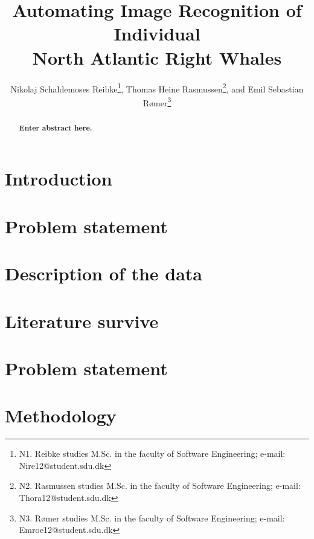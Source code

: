 \documentclass[10pt,a4paper,twocolumn]{article}
\begin{document}
\title{\textbf{Automating Image Recognition of Individual \\ North Atlantic Right Whales}}

\author{Nikolaj Schaldemoses Reibke\thanks{N1. Reibke studies M.Sc. in the faculty of Software Engineering; e-mail: Nire12@student.sdu.dk},
		Thomas Heine Rasmussen\thanks{N2. Rasmussen studies M.Sc. in the faculty of Software Engineering; e-mail: Thora12@student.sdu.dk},
        and Emil Sebastian R{\o}mer\thanks{N3. R{\o}mer studies M.Sc. in the faculty of Software Engineering; e-mail: Emroe12@student.sdu.dk}
}

\maketitle

\begin{abstract}
\textbf{Enter abstract here.}
\end{abstract}

\section{Introduction}


\section{Problem statement}


\section{Description of the data}


\section{Literature survive}


\section{Problem statement}


\section{Methodology}

\end{document}
